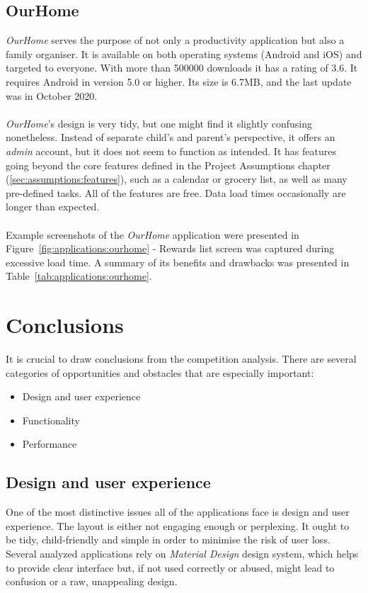 \subsection{OurHome}\label{subsec:market:solutions:ourhome}
\textit{OurHome}\cite{OurHomeChoresRewards,OurHomeChoresRewardsa} serves the purpose of not only a productivity application but also a family organiser. It is available on both operating systems (Android and iOS) and targeted to everyone. With more than 500000 downloads it has a rating of 3.6. It requires Android in version 5.0 or higher. Its size is 6.7MB, and the last update was in October 2020.
\\\\
\textit{OurHome}'s design is very tidy, but one might find it slightly confusing nonetheless. Instead of separate child's and parent's perspective, it offers an \textit{admin} account, but it does not seem to function as intended. It has features going beyond the core features defined in the Project Assumptions chapter (\ref{sec:assumptions:features}), such as a calendar or grocery list, as well as many pre-defined tasks. All of the features are free. Data load times occasionally are longer than expected.
\\\\
Example screenshots of the \textit{OurHome} application were presented in Figure~\ref{fig:applications:ourhome} - Rewards list screen was captured during excessive load time. A summary of its benefits and drawbacks was presented in Table~\ref{tab:applications:ourhome}.
\\




\section{Conclusions}\label{sec:market:conclusions}
It is crucial to draw conclusions from the competition analysis. There are several categories of opportunities and obstacles that are especially important:
\begin{itemize}
\item Design and user experience
\item Functionality
\item Performance
\end{itemize}

\subsection{Design and user experience}\label{subsec:market:conclusions:design}
One of the most distinctive issues all of the applications face is design and user experience. The layout is either not engaging enough or perplexing. It ought to be tidy, child-friendly and simple in order to minimise the risk of user loss. Several analyzed applications rely on \textit{Material Design} \cite{MaterialDesign} design system, which helps to provide clear interface but, if not used correctly or abused, might lead to confusion or a raw, unappealing design.

